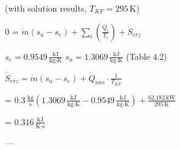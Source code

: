 (with solution results, \( T_{KF} = 295 \, \text{K} \))  

0 = \( \dot{m}(s_a - s_e) + \sum_i \left( \frac{\dot{Q}_i}{T_i} \right) + \dot{S}_{erz} \)  

\( s_e = 0.9549 \, \frac{\text{kJ}}{\text{kg·K}} \)  
\( s_a = 1.3069 \, \frac{\text{kJ}}{\text{kg·K}} \)  
(Table 4.2)  

\( \dot{S}_{erz} = \dot{m}(s_a - s_e) + \dot{Q}_{aus} \cdot \frac{1}{T_{KF}} \)  

= \( 0.3 \, \frac{\text{kg}}{\text{s}} \left( 1.3069 \, \frac{\text{kJ}}{\text{kg·K}} - 0.9549 \, \frac{\text{kJ}}{\text{kg·K}} \right) + \frac{62.182 \, \text{kW}}{295 \, \text{K}} \)  

= \( 0.316 \, \frac{\text{kJ}}{\text{K·s}} \)  

---
